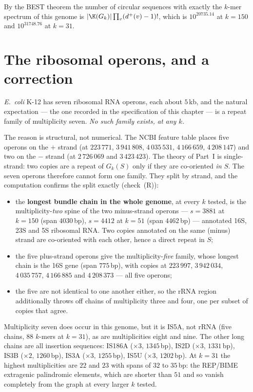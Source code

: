 By the BEST theorem the number of circular sequences with exactly the $k$-mer spectrum of
this genome is $|\K(G_k)|\prod_v(d^{+}(v)-1)!$, which is $10^{20735.14}$ at $k=150$ and
$10^{31748.76}$ at $k=31$.

\section{The ribosomal operons, and a correction}\label{ch15:sec:rrna}

\emph{E.\ coli} K-12 has seven ribosomal RNA operons, each about $5$\,kb, and the natural
expectation --- the one recorded in the specification of this chapter --- is a repeat family
of multiplicity seven. \emph{No such family exists, at any $k$.}

The reason is structural, not numerical. The NCBI feature table places five operons on
the $+$ strand (at $223\,771$, $3\,941\,808$, $4\,035\,531$, $4\,166\,659$, $4\,208\,147$)
and two on the $-$ strand (at $2\,726\,069$ and $3\,423\,423$). The theory of
Part~I is single-strand: two copies are a repeat of $G_k(S)$ only if
they are co-oriented \emph{in $S$}. The seven operons therefore cannot form one family.
They split by strand, and the computation confirms the split exactly (check~(R)):

\begin{itemize}
\item the \textbf{longest bundle chain in the whole genome}, at every $k$ tested, is the
multiplicity-\emph{two} spine of the two minus-strand operons --- $s=3881$ at $k=150$
(span $4030$\,bp), $s=4412$ at $k=51$ (span $4462$\,bp) --- annotated 16S, 23S and 5S
ribosomal RNA. Two copies annotated on the same (minus) strand are co-oriented with each
other, hence a direct repeat in $S$;
\item the five plus-strand operons give the multiplicity-\emph{five} family, whose longest
chain is the 16S gene (span $775$\,bp), with copies at $223\,997$, $3\,942\,034$,
$4\,035\,757$, $4\,166\,885$ and $4\,208\,373$ --- all five operons;
\item the five are not identical to one another either, so the rRNA region additionally
throws off chains of multiplicity three and four, one per subset of copies that agree.
\end{itemize}

Multiplicity seven does occur in this genome, but it is IS5A, not rRNA (five chains,
$88$ $k$-mers at $k=31$), as are multiplicities eight and nine. The other long chains are
all insertion sequences: IS186A ($\times3$, $1345$\,bp), IS2D ($\times3$, $1331$\,bp),
IS3B ($\times2$, $1260$\,bp), IS3A ($\times3$, $1255$\,bp), IS5U ($\times3$, $1202$\,bp).
At $k=31$ the highest multiplicities are $22$ and $23$ with spans of $32$ to $35$\,bp:
the REP/BIME extragenic palindromic elements, which are shorter than $51$ and so vanish
completely from the graph at every larger $k$ tested.

